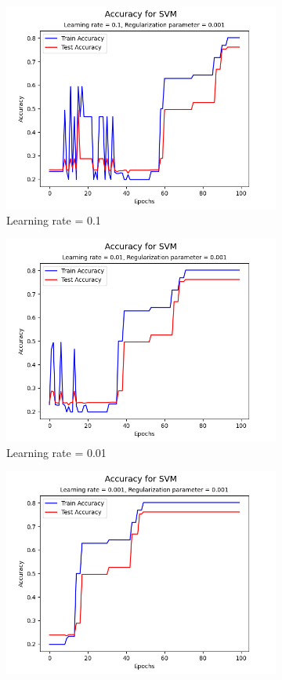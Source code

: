 \documentclass[a4paper, utf8]{ctexart}
\begin{document}
	\begin{figure}[htbp]
		\centering
		\begin{subfigure}{.45\textwidth}
			\centering
			\includegraphics[width=.9\textwidth]{./figure/myplotS7.png}
			\caption{Learning rate = 0.1}
		\end{subfigure}
		\begin{subfigure}{.45\textwidth}
			\centering
			\includegraphics[width=.9\textwidth]{./figure/myplotS8.png}
			\caption{Learning rate = 0.01}
		\end{subfigure}
		\begin{subfigure}{.45\textwidth}
			\centering
			\includegraphics[width=.9\textwidth]{./figure/myplotS9.png}

\end{subfigure}
\end{figure}
\end{document}
